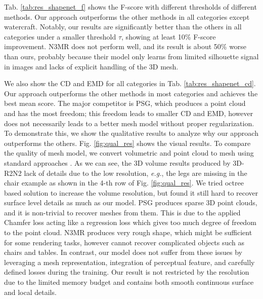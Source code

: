 \documentclass[runningheads]{llncs}
\def\eg{\emph{e.g.}}
\newcommand{\figref}[1]{Fig. \ref{#1}}
\newcommand{\tabref}[1]{Tab. \ref{#1}}
\begin{document}
\tabref{tab:res_shapenet_f} shows the F-score with different thresholds of different methods. Our approach outperforms the other methods in all categories except watercraft. Notably, our results are significantly better than the others in all categories under a smaller threshold $\tau$, showing at least 10\% F-score improvement.
N3MR does not perform well, and its result is about 50\% worse than ours, probably because their model only learns from limited silhouette signal in images and lacks of explicit handling of the 3D mesh.



We also show the CD and EMD for all categories in \tabref{tab:res_shapenet_cd}. Our approach outperforms the other methods in most categories and achieves the best mean score. The major competitor is PSG, which produces a point cloud and has the most freedom; this freedom leads to smaller CD and EMD, however does not necessarily leads to a better mesh model without proper regularization. To demonstrate this, we show the qualitative results to analyze why our approach outperforms the others.
\figref{fig:qual_res} shows the visual results. To compare the quality of mesh model, we convert volumetric and point cloud to mesh using standard approaches \cite{LorensenC87,BernardiniMRST99}. As we can see, the 3D volume results produced by 3D-R2N2 lack of details due to the low resolution, \eg, the legs are missing in the chair example as shown in the 4-th row of \figref{fig:qual_res}. We tried octree based solution \cite{TatarchenkoDB17} to increase the volume resolution, but found it still hard to recover surface level details as much as our model. PSG produces sparse 3D point clouds, and it is non-trivial to recover meshes from them.
This is due to the applied Chamfer loss acting like a regression loss which gives too much degree of freedom to the point cloud. N3MR produces very rough shape, which might be sufficient for some rendering tasks, however cannot recover complicated objects such as chairs and tables. 
In contrast, our model does not suffer from these issues by leveraging a mesh representation, integration of perceptual feature, and carefully defined losses during the training. Our result is not restricted by the resolution due to the limited memory budget and contains both smooth continuous surface and local details.
\end{document}
